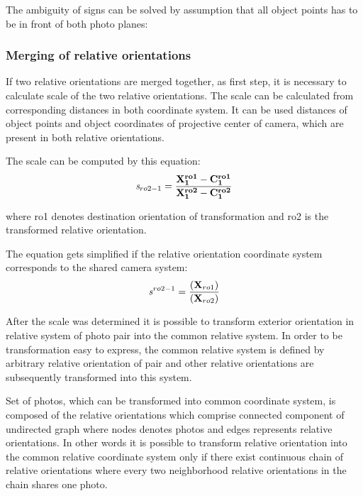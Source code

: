 \documentclass[a4paper,12pt]{article}
\newcommand{\evect}[1]{
{\bf #1}
}
\newcommand{\escal}[1]{
{\it #1}
}
\begin{document}
The ambiguity of signs can be solved by assumption that all object points has to be in front
of both photo planes:




\subsubsection{Merging of relative orientations}
\label{sec:ess_chain}

If two relative orientations are merged together, as first step, it is necessary to calculate scale of the two relative orientations.
The scale can be calculated from corresponding distances in both coordinate system. 
It can be used distances of 
object points and object coordinates of projective center of camera, which are present in both relative orientations.

The scale can be computed by this equation:
\begin{equation}
\escal{s}_{ro2-1} = \frac{\mathbf{\evect{X}^{ro1}_{1} - \evect{C^{ro1}_{1}}}}
	                {\mathbf{\evect{X}^{ro2}_{1} - \evect{C^{ro2}_{1}}}}
\end{equation}

where ro1 denotes destination orientation of transformation and ro2 is the transformed relative orientation. 

The equation gets simplified if the relative orientation coordinate system  corresponds to the shared camera system: 
\begin{equation}
\escal{s}^{ro2-1} = \frac{\mathbf(\evect{X}_{ro1})}
	                 {\mathbf(\evect{X}_{ro2})}
\end{equation}

After the scale was determined it is possible to transform exterior orientation in relative system of photo pair into the common relative system.
In order to be transformation easy to express, the common relative system is defined by arbitrary relative orientation of pair and other 
relative orientations are subsequently transformed into this system. 

Set of photos, which can be transformed into common coordinate system, is composed of the relative orientations
which comprise connected component of undirected graph where nodes denotes photos and edges represents relative orientations. 
In other words it is possible to transform relative orientation into the common relative coordinate system only if there 
exist continuous chain of relative orientations where every two neighborhood relative orientations in the chain shares one photo.
\end{document}

